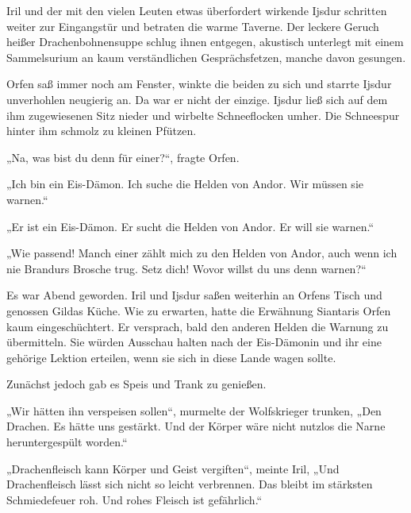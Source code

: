 Iril und der mit den vielen Leuten etwas überfordert wirkende Ijsdur schritten weiter zur Eingangstür und betraten die warme Taverne. Der leckere Geruch heißer Drachenbohnensuppe schlug ihnen entgegen, akustisch unterlegt mit einem Sammelsurium an kaum verständlichen Gesprächsfetzen, manche davon gesungen. 


Orfen saß immer noch am Fenster, winkte die beiden zu sich und starrte Ijsdur unverhohlen neugierig an. Da war er nicht der einzige. Ijsdur ließ sich auf dem ihm zugewiesenen Sitz nieder und wirbelte Schneeflocken umher. Die Schneespur hinter ihm schmolz zu kleinen Pfützen.

„Na, was bist du denn für einer?“, fragte Orfen.

„Ich bin ein Eis-Dämon. Ich suche die Helden von Andor. Wir müssen sie warnen.“

„Er ist ein Eis-Dämon. Er sucht die Helden von Andor. Er will sie warnen.“

„Wie passend! Manch einer zählt mich zu den Helden von Andor, auch wenn ich nie Brandurs Brosche trug. Setz dich! Wovor willst du uns denn warnen?“\bigskip







Es war Abend geworden. Iril und Ijsdur saßen weiterhin an Orfens Tisch und genossen Gildas Küche. Wie zu erwarten, hatte die Erwähnung Siantaris Orfen kaum eingeschüchtert. Er versprach, bald den anderen Helden die Warnung zu übermitteln. Sie würden Ausschau halten nach der Eis-Dämonin und ihr eine gehörige Lektion erteilen, wenn sie sich in diese Lande wagen sollte.

Zunächst jedoch gab es Speis und Trank zu genießen.

„Wir hätten ihn verspeisen sollen“, murmelte der Wolfskrieger trunken, „Den Drachen. Es hätte uns gestärkt. Und der Körper wäre nicht nutzlos die Narne heruntergespült worden.“

„Drachenfleisch kann Körper und Geist vergiften“, meinte Iril, „Und Drachenfleisch lässt sich nicht so leicht verbrennen. Das bleibt im stärksten Schmiedefeuer roh. Und rohes Fleisch ist gefährlich.“

